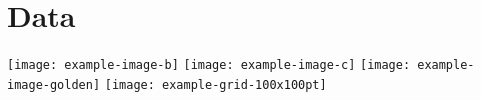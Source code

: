 \section{Data}
\lipsum[6-7]
\noindent\texttt{[image: example-image-b]}
\noindent\texttt{[image: example-image-c]}
\lipsum[8-9]
\texttt{[image: example-image-golden]}\qquad
\texttt{[image: example-grid-100x100pt]}